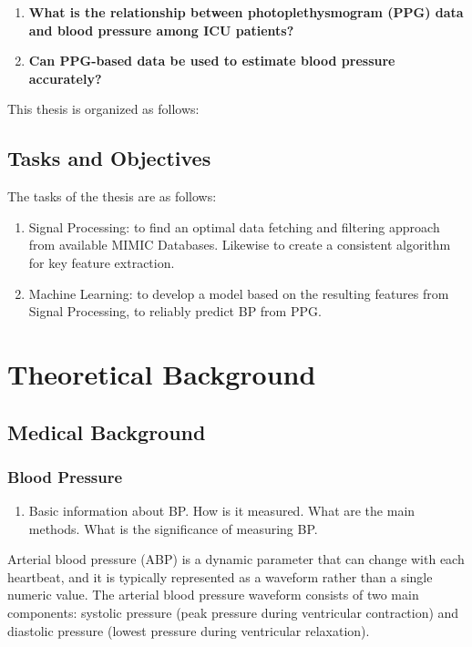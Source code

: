 \documentclass[10pt, bibliography=totoc]{scrartcl}
\begin{document}
\begin{enumerate}
\item \textbf{What is the relationship between photoplethysmogram (PPG) data and blood pressure among ICU patients?}

\item \textbf{Can PPG-based data be used to estimate blood pressure accurately?}

\end{enumerate}

This thesis is organized as follows:

\subsection{Tasks and Objectives}

The tasks of the thesis are as follows:

\begin{enumerate}
\item Signal Processing: to find an optimal data fetching and filtering approach from available MIMIC Databases. Likewise to create a consistent algorithm for key feature extraction.
\item Machine Learning: to develop a model based on the resulting features from Signal Processing, to reliably predict BP from PPG. 
\end{enumerate}

\section{Theoretical Background}

\subsection{Medical Background}

\subsubsection{Blood Pressure}

\begin{enumerate}
\item Basic information about BP. How is it measured. What are the main methods. What is the significance of measuring BP. \cite{WhatBloodPressure2019}
\end{enumerate}

Arterial blood pressure (ABP) is a dynamic parameter that can change with each heartbeat, and it is typically represented as a waveform rather than a single numeric value.
The arterial blood pressure waveform consists of two main components: systolic pressure (peak pressure during ventricular contraction) and diastolic pressure (lowest pressure during ventricular relaxation).
\end{document}

